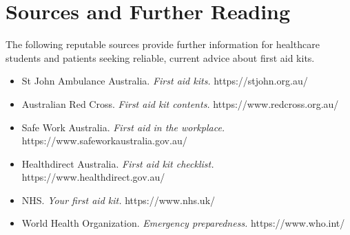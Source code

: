 \section*{Sources and Further Reading}
The following reputable sources provide further information for healthcare students and patients seeking reliable, current advice about first aid kits.
\begin{itemize}
    \item St John Ambulance Australia. \textit{First aid kits.} https://stjohn.org.au/
    \item Australian Red Cross. \textit{First aid kit contents.} https://www.redcross.org.au/
    \item Safe Work Australia. \textit{First aid in the workplace.} https://www.safeworkaustralia.gov.au/
    \item Healthdirect Australia. \textit{First aid kit checklist.} https://www.healthdirect.gov.au/
    \item NHS. \textit{Your first aid kit.} https://www.nhs.uk/
    \item World Health Organization. \textit{Emergency preparedness.} https://www.who.int/
\end{itemize}

